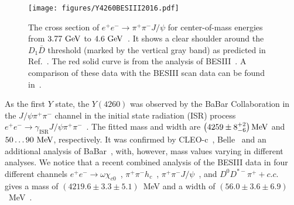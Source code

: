 \begin{figure}[tb]
\begin{center}
  \texttt{[image: figures/Y4260BESIII2016.pdf]}
\caption{ The cross section of $e^+e^-\to \pi^+\pi^-J/\psi$ for center-of-mass 
energies from $3.77~\mathrm{GeV}$ to $4.6~\mathrm{GeV}$~\cite{Ablikim:2016qzw}.
It shows a clear shoulder around the $D_1\bar D$ threshold (marked by the
vertical gray band) as predicted in Ref.~\cite{Cleven:2013mka}. The red solid curve is from the 
analysis of BESIII~\cite{Ablikim:2016qzw}. A comparison of these data with the
BESIII scan data can be found in~\cite{Gao:2017sqa}. }
\label{fig:Y4260-BESIII}
\end{center}
\end{figure}



As the first $Y$ state, the $Y(4260)$
was observed by  the BaBar Collaboration in the $J/\psi\pi^+\pi^-$ channel
in the initial state radiation (ISR) process
$e^+e^-\to\gamma_\text{ISR} J/\psi\pi^+\pi^-$~\cite{Aubert:2005rm}.
The fitted mass and width are $\left(4259\pm 8^{+2}_{-6}\right)\mathrm{MeV}$ and 
$50\ldots 90~\mathrm{MeV}$,
respectively. It was confirmed by
CLEO-c~\cite{He:2006kg}, Belle~\cite{Yuan:2007sj} and an additional analysis of
BaBar~\cite{Lees:2012cn}, with, however, mass values varying in different 
analyses. We notice that a recent combined analysis of the BESIII data in four 
different channels $e^+e^-\to \omega\chi_{c0}$~\cite{Ablikim:2015uix}, 
$\pi^+\pi^-h_c$~\cite{BESIII:2016adj}, 
$\pi^+\pi^- J/\psi$~\cite{Ablikim:2016qzw}, 
and $D^0D^{*-}\pi^++c.c.$~\cite{yuantalk}
gives a mass of $(4219.6\pm3.3\pm5.1)$~MeV and a width of 
$(56.0\pm3.6\pm6.9)$~MeV~\cite{Gao:2017sqa}.

